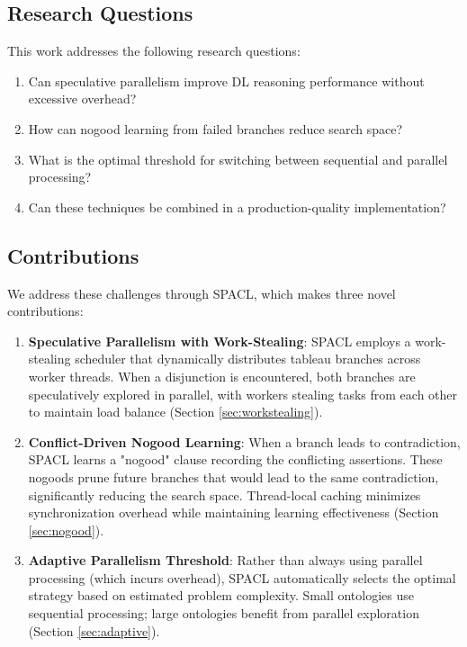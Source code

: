 \documentclass[preprint,12pt]{elsarticle}
\begin{document}
\subsection{Research Questions}
\label{sec:questions}

This work addresses the following research questions:

\begin{enumerate}[RQ1:]
    \item Can speculative parallelism improve DL reasoning performance without excessive overhead?
    \item How can nogood learning from failed branches reduce search space?
    \item What is the optimal threshold for switching between sequential and parallel processing?
    \item Can these techniques be combined in a production-quality implementation?
\end{enumerate}

\subsection{Contributions}
\label{sec:contributions}

We address these challenges through SPACL, which makes three novel contributions:

\begin{enumerate}[C1:]
    \item \textbf{Speculative Parallelism with Work-Stealing}: SPACL employs a work-stealing scheduler that dynamically distributes tableau branches across worker threads. When a disjunction is encountered, both branches are speculatively explored in parallel, with workers stealing tasks from each other to maintain load balance (Section \ref{sec:workstealing}).
    
    \item \textbf{Conflict-Driven Nogood Learning}: When a branch leads to contradiction, SPACL learns a "nogood" clause recording the conflicting assertions. These nogoods prune future branches that would lead to the same contradiction, significantly reducing the search space. Thread-local caching minimizes synchronization overhead while maintaining learning effectiveness (Section \ref{sec:nogood}).
    
    \item \textbf{Adaptive Parallelism Threshold}: Rather than always using parallel processing (which incurs overhead), SPACL automatically selects the optimal strategy based on estimated problem complexity. Small ontologies use sequential processing; large ontologies benefit from parallel exploration (Section \ref{sec:adaptive}).
\end{enumerate}
\end{document}
